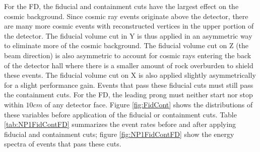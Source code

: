 For the FD, the fiducial and containment cuts have the largest effect on the cosmic background. Since cosmic ray events originate above the detector, there are many more cosmic events with reconstructed vertices in the upper portion of the detector. The fiducial volume cut in Y is thus applied in an asymmetric way to eliminate more of the cosmic background. The fiducial volume cut on Z (the beam direction) is also asymmetric to account for cosmic rays entering the back of the detector hall where there is a smaller amount of rock overburden to shield these events. The fiducial volume cut on X is also applied slightly asymmetrically for a slight performance gain. Events that pass these fiducial cuts must still pass the containment cuts. For the FD, the leading prong must neither start nor stop within $10\unit{cm}$ of any detector face. Figure \ref{fig:FidCont} shows the distributions of these variables before application of the fiducial or containment cuts. Table \ref{tab:NP1FidContFD} summarizes the event rates before and after applying fiducial and containment cuts; figure \ref{fig:NP1FidContFD} show the energy spectra of events that pass these cuts.
